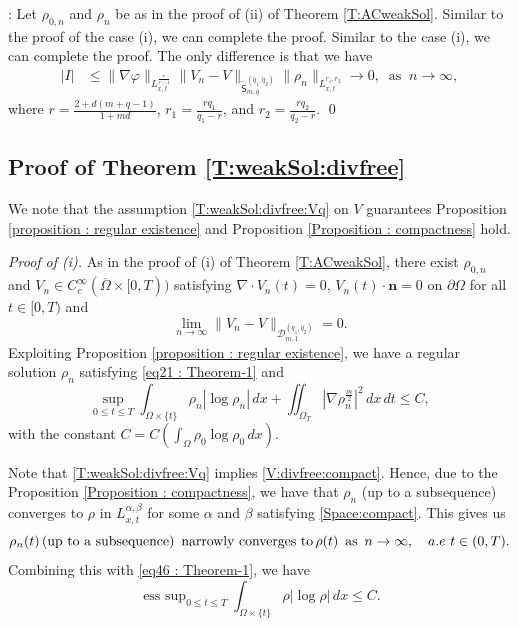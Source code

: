 \documentclass{amsart}
\numberwithin{equation}{section}
\DeclareMathOperator*{\esssup}{ess \ sup}
\begin{document}
 : Let $\rho_{0,n}$ and $\rho_n$ be as in the proof of (ii) of Theorem \ref{T:ACweakSol}. Similar to the proof of the case (i), we can complete the proof.
 Similar to the case (i), we can complete the proof.
The only difference is that we have
 \begin{equation*}\label{eq44 : Theorem-1}
\begin{aligned}
| I | &\leq  \| \nabla \varphi \|_{L_{x,t}^{\frac{r}{r-1}}} \|V_n-V\|_{\tilde{\mathsf{S}}_{m,q}^{(\tilde{q}_1,\tilde{q}_2)}} \|\rho_n\|_{L^{r_1, r_2}_{x,t}} \longrightarrow 0, \ \mbox{ as } \ n\rightarrow \infty,
\end{aligned}
\end{equation*}
where $ r= \frac{2+d(m+q-1)}{1+md}$,  $r_1=\frac{ r q_1}{q_1-r} $,   and $r_2=\frac{ r q_2}{q_2-r}$.  
\qed



\subsection{Proof of Theorem \ref{T:weakSol:divfree}}
We note that the assumption \eqref{T:weakSol:divfree:Vq} on $V$ guarantees Proposition \ref{proposition : regular existence} and Proposition \ref{Proposition : compactness} hold.

{\it Proof of (i).}  As in the proof of (i) of Theorem \ref{T:ACweakSol}, there exist $\rho_{0,n}$ and $V_n\in C^\infty_c(\overline{\Omega}\times[0,T)) $ satisfying  $\nabla \cdot V_n(t)=0$, $V_n(t)\cdot \mathbf{n}=0$ on $\partial\Omega$ for all $t\in[0,T)$ and
\begin{equation*}\label{eq45 : Theorem-1}
\lim_{n \rightarrow \infty}\|V_n - V \|_{\mathcal{D}_{m,1}^{(q_1,q_2)} } =0.
\end{equation*}
Exploiting Proposition \ref{proposition : regular existence}, we have a regular solution $\rho_n$ satisfying \eqref{eq21 : Theorem-1} and   
\begin{equation}\label{eq46 : Theorem-1}
\sup_{0\leq t \leq T}\int_{\Omega \times \{ t\}}\rho_n |\log \rho_n|  \,dx
+ \iint_{\Omega_T} \left|\nabla \rho_{n}^{\frac{m}{2}} \right|^2 \,dx\,dt  \leq C,
\end{equation}
with the constant $C=C ( \int_{\Omega} \rho_{0} \log \rho_{0} \,dx )$. 

Note that \eqref{T:weakSol:divfree:Vq} implies \eqref{V:divfree:compact}. Hence, due to the Proposition \ref{Proposition : compactness},  we have that $\rho_n$ (up to a subsequence) converges to $\rho$ in $ L_{x,t}^{\alpha, \beta}$ for some $\alpha$ and $\beta$ satisfying \eqref{Space:compact}. This gives us 
 \begin{equation*}
\rho_n(t) \,\mbox{(up to a subsequence) \,narrowly converges to}\, \rho(t) \,~\mbox{as}~ \, n \rightarrow \infty, \quad a.e ~ t \in (0,T).
\end{equation*}
Combining this with \eqref{eq46 : Theorem-1}, we have 
 \begin{equation*}
\esssup_{0\leq t \leq T}\int_{\Omega \times \{ t\}}\rho |\log \rho|  \,dx \leq C.
\end{equation*}
 
\end{document}
